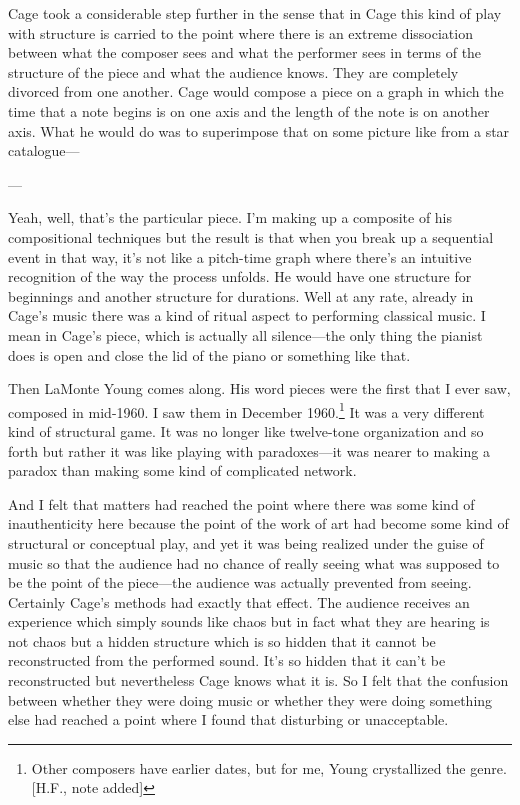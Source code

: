 Cage took a considerable step further in the sense that in Cage this 
kind of play with structure is carried to the point where there is an 
extreme dissociation between what the composer sees and what the 
performer sees in terms of the structure of the piece and what the 
audience knows. They are completely divorced from one another. Cage 
would compose a piece on a graph in which the time that a note begins 
is on one axis and the length of the note is on another axis. What he 
would do was to superimpose that on some picture like from a star 
catalogue--- 

 --- 

 Yeah, well, that's the particular piece. I'm making up a 
composite of his compositional techniques but the result is that when you 
break up a sequential event in that way, it's not like a pitch-time graph 
where there's an intuitive recognition of the way the process unfolds. 
He would have one structure for beginnings and another structure for 
durations. Well at any rate, already in Cage's music there was a kind of 
ritual aspect to performing classical music. I mean in Cage's piece, 
which is actually all silence---the only thing the pianist does is open and 
close the lid of the piano or something like that. 

Then LaMonte Young comes along. His word pieces were the first 
that I ever saw, composed in mid-1960. I saw them in December 
1960.\footnote{Other composers have earlier dates, but for me, 
Young crystallized the genre. [H.F., note added]}
It was a very different kind of structural game. It was no longer like 
twelve-tone organization and so forth but rather it was like playing 
with paradoxes---it was nearer to making a paradox than making some 
kind of complicated network. 

And I felt that matters had reached the point where there was 
some kind of inauthenticity here because the point of the work of art 
had become some kind of structural or conceptual play, and yet it was 
being realized under the guise of music so that the audience had no 
chance of really seeing what was supposed to be the point of the 
piece---the audience was actually prevented from seeing. Certainly 
Cage's methods had exactly that effect. The audience receives an 
experience which simply sounds like chaos but in fact what they are 
hearing is not chaos but a hidden structure which is so hidden that it 
cannot be reconstructed from the performed sound. It's so hidden that 
it can't be reconstructed but nevertheless Cage knows what it is. So I 
felt that the confusion between whether they were doing music or 
whether they were doing something else had reached a point where I 
found that disturbing or unacceptable. 


